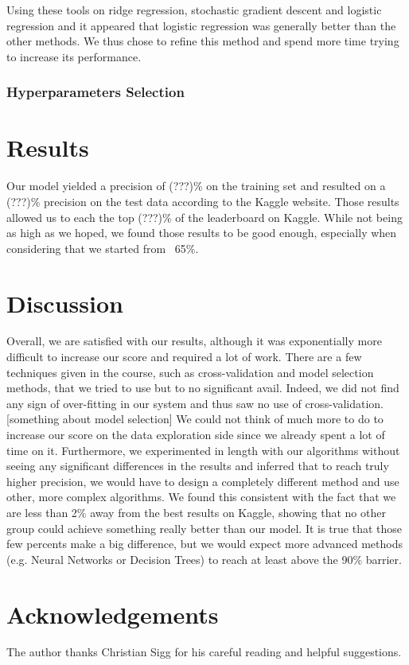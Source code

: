 \documentclass[10pt,conference,compsocconf]{IEEEtran}
\begin{document}
Using these tools on ridge regression, stochastic gradient descent and logistic regression and it appeared that logistic regression was generally better than the other methods. We thus chose to refine this method
and spend more time trying to increase its performance. 
\subsubsection{Hyperparameters Selection}


\section{Results}
Our model yielded a precision of (???)\% on the training set and resulted on a (???)\% precision on the test data according to the Kaggle website. Those results allowed us to each the top (???)\% of the leaderboard on Kaggle. While not being as high as we hoped, we found those results to be good enough, especially when considering that we started from ~65\%.

\section{Discussion}
Overall, we are satisfied with our results, although it was exponentially more difficult to increase our score and required a lot of work. There are a few techniques given in the course, such as cross-validation and model selection methods, that we tried to use but to no significant avail. Indeed, we did not find any sign of over-fitting in our system and thus saw no use of cross-validation.
[something about model selection]
We could not think of much more to do to increase our score on the data exploration side since we already spent a lot of time on it. Furthermore, we experimented in length with our algorithms without seeing any significant differences in the results and inferred that to reach truly higher precision, we would have to design a completely different method and use other, more complex algorithms. We found this consistent with the fact that we are less than 2\% away from the best results on Kaggle, showing that no other group could achieve something really better than our model. It is true that those few percents make a big difference, but we would expect more advanced methods (e.g. Neural Networks or Decision Trees) to reach at least above the 90\% barrier. 


\section*{Acknowledgements}
The author thanks Christian Sigg for his careful reading and helpful
suggestions.



\end{document}
